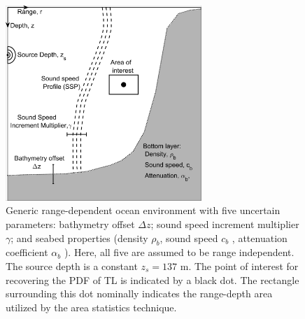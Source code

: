 \begin{figure}[htb]
  \centering
  \includegraphics[width=0.66\textwidth]{./figs/asuq_figs/2}
  \caption[A schematic ocean environment with relevant uncertain
  parameters, sound source, and area statics sample area]{Generic range-dependent
    ocean environment with five uncertain parameters: bathymetry
    offset $\Delta z$; sound speed increment multiplier $\gamma$; and
    seabed properties (density $\rho_b$, sound speed $c_b$ ,
    attenuation coefficient $\alpha_b$ ). Here, all five are assumed
    to be range independent. The source depth is a constant $z_s=137$
    m. The point of interest for recovering the PDF of \ac{TL} is
    indicated by a black dot. The rectangle surrounding this dot
    nominally indicates the range-depth area utilized by the area
    statistics technique.}
  \label{fig:asuq_astats_schematic}
\end{figure}

